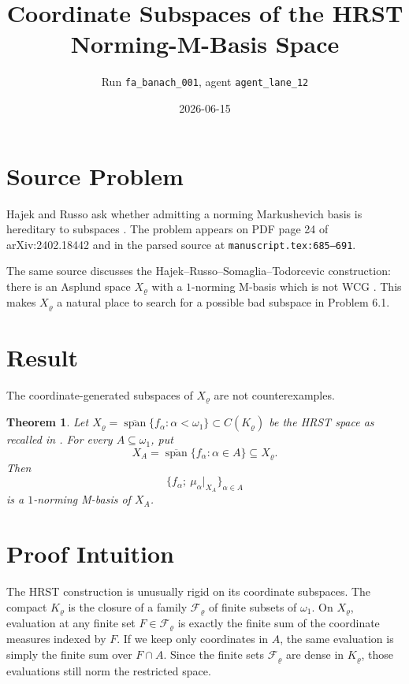 \documentclass[11pt]{article}
\title{Coordinate Subspaces of the HRST Norming-M-Basis Space}
\author{Run \texttt{fa\_banach\_001}, agent \texttt{agent\_lane\_12}}
\date{2026-06-15}
\newtheorem{theorem}{Theorem}
\newcommand{\clspn}{\overline{\operatorname{span}}}
\newcommand{\Krho}{K_\varrho}
\newcommand{\Frho}{\mathcal F_\varrho}
\newcommand{\Xrho}{X_\varrho}
\begin{document}
\maketitle

\section*{Source Problem}

Hajek and Russo ask whether admitting a norming Markushevich basis is
hereditary to subspaces \cite[Problem 6.1]{HR}. The problem appears on PDF
page 24 of arXiv:2402.18442 and in the parsed source at
\texttt{manuscript.tex:685--691}.

The same source discusses the Hajek--Russo--Somaglia--Todorcevic construction:
there is an Asplund space $\Xrho$ with a $1$-norming M-basis which is not WCG
\cite[Theorem A, recalled as Theorem 4.4]{HR}. This makes $\Xrho$ a natural
place to search for a possible bad subspace in Problem 6.1.

\section*{Result}

The coordinate-generated subspaces of $\Xrho$ are not counterexamples.

\begin{theorem}\label{thm:coordinate-subspaces}
Let $\Xrho=\clspn\{f_\alpha:\alpha<\omega_1\}\subset C(\Krho)$ be the HRST
space as recalled in \cite[Theorem 4.4]{HR}. For every
$A\subseteq\omega_1$, put
\[
    X_A=\clspn\{f_\alpha:\alpha\in A\}\subseteq \Xrho .
\]
Then
\[
    \{f_\alpha;\ \mu_\alpha|_{X_A}\}_{\alpha\in A}
\]
is a $1$-norming M-basis of $X_A$.
\end{theorem}

\section*{Proof Intuition}

The HRST construction is unusually rigid on its coordinate subspaces. The
compact $\Krho$ is the closure of a family $\Frho$ of finite subsets of
$\omega_1$. On $\Xrho$, evaluation at any finite set
$F\in\Frho$ is exactly the finite sum of the coordinate measures indexed by
$F$. If we keep only coordinates in $A$, the same evaluation is simply the
finite sum over $F\cap A$. Since the finite sets $\Frho$ are dense in
$\Krho$, those evaluations still norm the restricted space.
\end{document}
